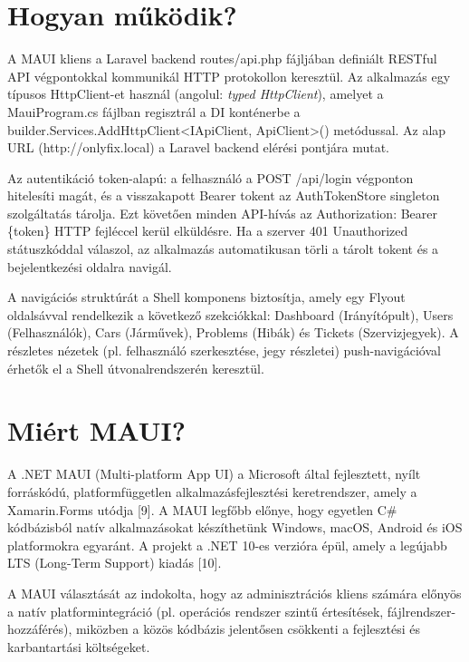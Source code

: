 \section{Hogyan működik?}\label{hogyan-mux171kuxf6dik-1}

A MAUI kliens a Laravel backend routes/api.php fájljában definiált RESTful API végpontokkal kommunikál HTTP protokollon keresztül. Az alkalmazás egy típusos HttpClient-et használ (angolul: \emph{typed HttpClient}), amelyet a MauiProgram.cs fájlban regisztrál a DI konténerbe a builder.Services.AddHttpClient\textless IApiClient, ApiClient\textgreater() metódussal. Az alap URL (http://onlyfix.local) a Laravel backend elérési pontjára mutat.

Az autentikáció token-alapú: a felhasználó a POST /api/login végponton hitelesíti magát, és a visszakapott Bearer tokent az AuthTokenStore singleton szolgáltatás tárolja. Ezt követően minden API-hívás az Authorization: Bearer \{token\} HTTP fejléccel kerül elküldésre. Ha a szerver 401 Unauthorized státuszkóddal válaszol, az alkalmazás automatikusan törli a tárolt tokent és a bejelentkezési oldalra navigál.

A navigációs struktúrát a Shell komponens biztosítja, amely egy Flyout oldalsávval rendelkezik a következő szekciókkal: Dashboard (Irányítópult), Users (Felhasználók), Cars (Járművek), Problems (Hibák) és Tickets (Szervizjegyek). A részletes nézetek (pl. felhasználó szerkesztése, jegy részletei) push-navigációval érhetők el a Shell útvonalrendszerén keresztül.

\section{Miért MAUI?}\label{miuxe9rt-maui}

A .NET MAUI (Multi-platform App UI) a Microsoft által fejlesztett, nyílt forráskódú, platformfüggetlen alkalmazásfejlesztési keretrendszer, amely a Xamarin.Forms utódja {[}9{]}. A MAUI legfőbb előnye, hogy egyetlen C\# kódbázisból natív alkalmazásokat készíthetünk Windows, macOS, Android és iOS platformokra egyaránt. A projekt a .NET 10-es verzióra épül, amely a legújabb LTS (Long-Term Support) kiadás {[}10{]}.

A MAUI választását az indokolta, hogy az adminisztrációs kliens számára előnyös a natív platformintegráció (pl. operációs rendszer szintű értesítések, fájlrendszer-hozzáférés), miközben a közös kódbázis jelentősen csökkenti a fejlesztési és karbantartási költségeket.

